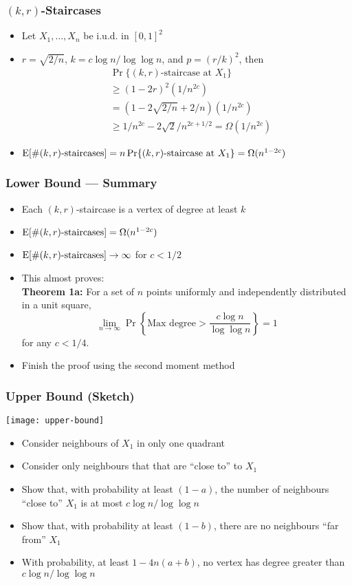 \documentclass{beamer}
\begin{document}
\frame
{
  \frametitle{$(k,r)$-Staircases}

  \begin{itemize}
    \item Let $X_1,\ldots,X_n$ be i.u.d. in $[0,1]^2$
    \item $r=\sqrt{2/n}$, $k=c\log n/\log\log n$, and $p=(r/k)^2$, then
    \[\begin{aligned}
      & \Pr\{\mbox{$(k,r)$-staircase at $X_1$}\}  \\
       &  \ge (1-2r)^2 (1/n^{2c})  \\
       &  = (1-2\sqrt{2/n}+2/n)(1/n^{2c}) \\
       &  \ge 1/n^{2c} - 2\sqrt{2}/n^{2c+1/2} = \Omega(1/n^{2c})
      \end{aligned}
    \]
    \item $\mathrm{E}[\mbox{\#$(k,r)$-staircases}] = n\Pr\{\mbox{$(k,r)$-staircase at $X_1$}\}
      = \Omega(n^{1-2c}) $
  \end{itemize}
}

\frame
{
  \frametitle{Lower Bound --- Summary}

  \begin{itemize}
    \item Each $(k,r)$-staircase is a vertex of degree at least $k$
    \item $\mathrm{E}[\mbox{\#$(k,r)$-staircases}]=\Omega(n^{1-2c})$
    \item $\mathrm{E}[\mbox{\#$(k,r)$-staircases}]\rightarrow\infty$ for $c < 1/2$
    \item This almost proves:\\
       \textbf{Theorem 1a:}
           For a set of $n$ points uniformly and independently distributed
		in a unit square, 
           \[\lim_{n\rightarrow\infty}
              \Pr\left\{\mbox{Max degree} > \frac{c\log
n}{\log\log n}\right\} = 1 \]
           for any $c < 1/4$.
    \item Finish the proof using the second moment method
  \end{itemize}
}

\frame
{
  \frametitle{Upper Bound (Sketch)}

  \begin{center}
    \texttt{[image: upper-bound]}
  \end{center}
  \begin{itemize}
    \item Consider neighbours of $X_1$ in only one quadrant
    \item Consider only neighbours that that are ``close to'' to $X_1$
    \item Show that, with probability at least $(1-a)$, the number of
neighbours ``close to'' $X_1$ is at most $c\log n/\log\log n$
    \item Show that, with probability at least $(1-b)$, there are no neighbours
   ``far from'' $X_1$
    \item With probability, at least $1-4n(a+b)$,
no vertex has degree greater than $c\log n/\log\log n$
  \end{itemize}
}
\end{document}
